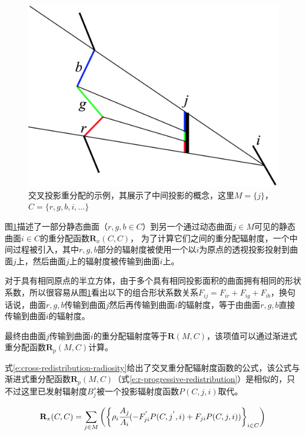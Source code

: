 \begin{figure}
\sidecaption
	\includegraphics[width=.5\textwidth]{figures/r/path-39}
	\caption{交叉投影重分配的示例，其展示了中间投影的概念，这里$M = \{j\}$，$C = \{r,g,b,i,...\}$}
	\label{f:r-c-c}
\end{figure}

图\ref{f:r-c-c}描述了一部分静态曲面（$r,g,b\in C$）到另一个通过动态曲面$j\in M$可见的静态曲面$i\in C$的重分配函数$\mathbf{R}_x(C,C)$， 为了计算它们之间的重分配辐射度，一个中间过程被引入，其中$r,g,b$部分的辐射度被使用一个以$i$为原点的透视投影投射到曲面$j$上，然后曲面$j$上的辐射度被传输到曲面$i$上。

对于具有相同原点的半立方体，由于多个具有相同投影面积的曲面拥有相同的形状系数，所以很容易从图\ref{f:r-c-c}看出以下的组合形状系数关系$F_{ij}=F_{ir}+F_{ig}+F_{ib}$，换句话说，曲面$r,g,b$传输到曲面$j$然后再传输到曲面$i$的辐射度，等于由曲面$r,g,b$直接传输到曲面$i$的辐射度。

最终由曲面$j$传输到曲面$i$的重分配辐射度等于$\mathbf{R}(M,C)$，该项值可以通过渐进式重分配函数$\mathbf{R}_p(M, C)$计算。

式\ref{e:cross-redistribution-radiosity}给出了交叉重分配辐射度函数的公式，该公式与渐进式重分配函数$\mathbf{R}_p(M,C)$（式\ref{e:r-progressive-redistribution}）是相似的，只不过这里已发射辐射度$B_j^{s}$被一个投影辐射度函数$P(C,j,i)$取代。

\begin{equation}\label{e:r-cross-redistribution-radiosity}
	\mathbf{R}_x(C,C)=\sum_{j\in M}\bigg(\bigg\{\rho_i \cfrac{A_j}{A_i}(-F^{'}_{ji}P(C,j^{'},i)+F_{ji}P(C,j,i))\bigg\}_{i\in C}\bigg)	
\end{equation}

